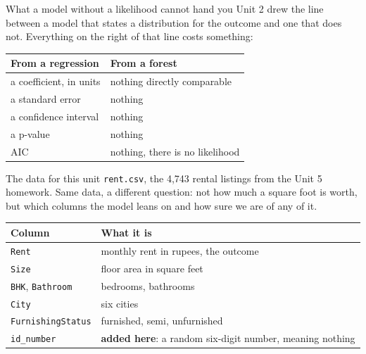 \documentclass[aspectratio=169]{beamer}
\begin{document}
\begin{frame}{What a model without a likelihood cannot hand you}
Unit 2 drew the line between a model that states a distribution for the outcome and one that does
not. Everything on the right of that line costs something:
\begin{center}\small
\begin{tabular}{L{0.40\textwidth} L{0.50\textwidth}}
\toprule
\textbf{From a regression} & \textbf{From a forest} \\
\midrule
a coefficient, in units & nothing directly comparable \\
a standard error & nothing \\
a confidence interval & nothing \\
a p-value & nothing \\
AIC & nothing, there is no likelihood \\
\bottomrule
\end{tabular}
\end{center}
\end{frame}

\begin{frame}{The data for this unit}
\texttt{rent.csv}, the 4,743 rental listings from the Unit 5 homework. Same data, a different
question: not how much a square foot is worth, but which columns the model leans on and how sure
we are of any of it.
\begin{center}\small
\begin{tabular}{L{0.26\textwidth} L{0.62\textwidth}}
\toprule
\textbf{Column} & \textbf{What it is} \\
\midrule
\texttt{Rent} & monthly rent in rupees, the outcome \\
\texttt{Size} & floor area in square feet \\
\texttt{BHK}, \texttt{Bathroom} & bedrooms, bathrooms \\
\texttt{City} & six cities \\
\texttt{FurnishingStatus} & furnished, semi, unfurnished \\
\texttt{id\_number} & \textbf{added here}: a random six-digit number, meaning nothing \\
\bottomrule
\end{tabular}
\end{center}
\end{frame}

\end{document}
